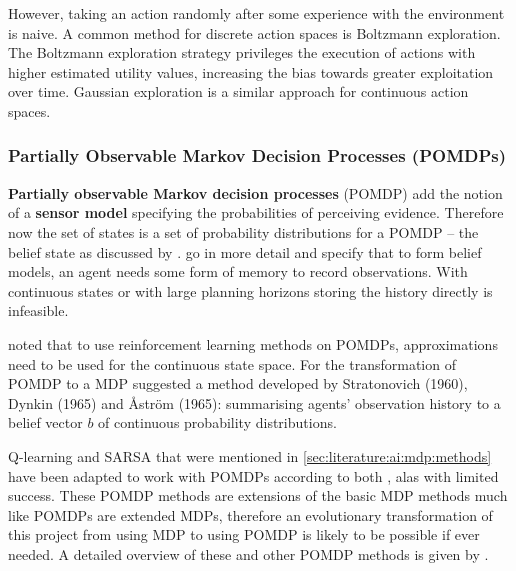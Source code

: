 However, taking an action randomly after some experience with the environment
is naive. A common method for discrete action spaces is Boltzmann exploration.
The Boltzmann exploration strategy privileges the execution of actions with
higher estimated utility values, increasing the bias towards greater
exploitation over time. Gaussian exploration is a similar approach for
continuous action spaces. \parencite{Hasselt2012ai+continuous}


\subsubsection{Partially Observable Markov Decision Processes (POMDPs)}
\label{sec:literature:ai:pomdp}

\textbf{Partially observable Markov decision processes} (POMDP) add the notion
of a \textbf{sensor model} specifying the probabilities of perceiving evidence.
Therefore now the set of states is a set of probability distributions for a
POMDP -- the belief state as discussed by \textcite{Russell2010ai+modern}.
\textcite{Spaan2012ai+pomdp} go in more detail and specify that to form belief
models, an agent needs some form of memory to record observations. With
continuous states or with large planning horizons storing the history directly
is infeasible.

\textcite{Russell2010ai+modern} noted that to use reinforcement learning
methods on POMDPs, approximations need to be used for the continuous state
space. For the transformation of POMDP to a MDP \textcite{Spaan2012ai+pomdp}
suggested a method developed by Stratonovich (1960), Dynkin (1965) and Åström
(1965): summarising agents' observation history to a belief vector \(b\) of
continuous probability distributions.

Q-learning and SARSA that were mentioned in \ref{sec:literature:ai:mdp:methods}
have been adapted to work with POMDPs according to both
\textcite{Russell2010ai+modern, Spaan2012ai+pomdp}, alas with limited success.
These POMDP methods are extensions of the basic MDP methods much like POMDPs
are extended MDPs, therefore an evolutionary transformation of this project
from using MDP to using POMDP is likely to be possible if ever needed. A
detailed overview of these and other POMDP methods is given by
\textcite{Spaan2012ai+pomdp}.
